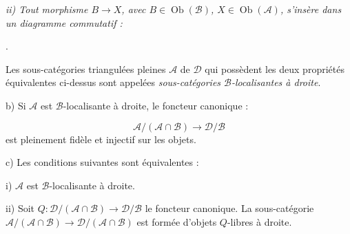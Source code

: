 \clearpage
{}%
\begingroup
\small
\setlength{\parskip}{0pt}%
\setlength{\emergencystretch}{1.5em}%
\setlength{\abovedisplayskip}{3pt plus 1pt minus 1pt}%
\setlength{\belowdisplayskip}{3pt plus 1pt minus 1pt}%

\begingroup\itshape
{}
\noindent\hspace{1.2em}ii) Tout morphisme $B\longrightarrow X$, avec
$B\in\operatorname{Ob}(\mathcal B)$, $X\in\operatorname{Ob}(\mathcal A)$,
s'insère dans un diagramme commutatif :

\begin{center}
  \quad .
\end{center}

Les sous-catégories triangulées pleines $\mathcal A$ de $\mathcal D$ qui
possèdent les deux propriétés équivalentes ci-dessus sont appelées
\emph{sous-catégories $\mathcal B$-localisantes à droite}.

\par\noindent b) Si $\mathcal A$ est $\mathcal B$-localisante à droite, le
foncteur canonique :

\[
  \mathcal A/(\mathcal A\cap\mathcal B)
  \longrightarrow\mathcal D/\mathcal B
\]
est pleinement fidèle et injectif sur les objets.

\par\noindent c) Les conditions suivantes sont équivalentes :

\par\noindent\hspace{1.2em}i) $\mathcal A$ est $\mathcal B$-localisante à
droite.

\par\noindent\hspace{1.2em}ii) Soit
$Q\colon\mathcal D/(\mathcal A\cap\mathcal B)\longrightarrow
\mathcal D/\mathcal B$ le foncteur canonique. La sous-catégorie
$\mathcal A/(\mathcal A\cap\mathcal B)\longrightarrow
\mathcal D/(\mathcal A\cap\mathcal B)$ est formée d'objets $Q$-libres à
droite.
\endgroup

